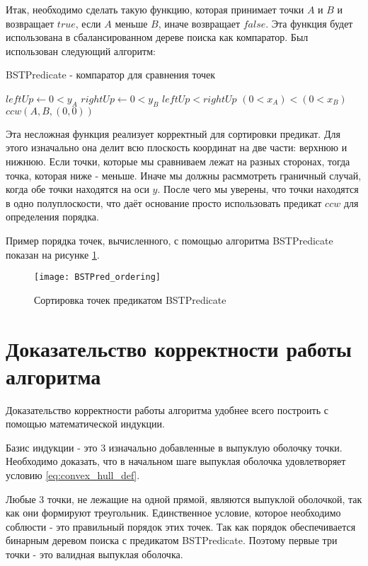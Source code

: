 Итак, необходимо сделать такую функцию, которая принимает точки $A$ и $B$ и возвращает $true$, если $A$ меньше $B$, иначе возвращает $false$. Эта функция будет использована в сбалансированном дереве поиска как компаратор. Был использован следующий алгоритм:

\begin{algorithm}[H]
	\caption{BSTPredicate - компаратор для сравнения точек}
	\label{alg:bst_predicate}
	\begin{algorithmic}[1]
		\State $leftUp \gets 0<y_A$
		\State $rightUp \gets 0<y_B$
			\Return $leftUp < rightUp$
		\EndIf
			\Return $(0<x_A) < (0<x_B)$
		\EndIf
		\Return $ccw(A, B, (0, 0))$
		\EndProcedure
	\end{algorithmic}
\end{algorithm}

Эта несложная функция реализует корректный для сортировки предикат. Для этого изначально она делит всю плоскость координат на две части: верхнюю и нижнюю. Если точки, которые мы сравниваем лежат на разных сторонах, тогда точка, которая ниже - меньше. Иначе мы должны расммотреть граничный случай, когда обе точки находятся на оси $y$. После чего мы уверены, что точки находятся в одно полуплоскости, что даёт основание просто использовать предикат $ccw$ для определения порядка.

Пример порядка точек, вычисленного, с помощью алгоритма BSTPredicate показан на рисунке \ref{img:BSTPred_ordering}.

\begin{figure}[H]
	\centering
	\texttt{[image: BSTPred\_ordering]}
	\caption{Сортировка точек предикатом BSTPredicate}
	\label{img:BSTPred_ordering}
\end{figure}

\section{Доказательство корректности работы алгоритма} \label{subsect2_3}

Доказательство корректности работы алгоритма удобнее всего построить с помощью математической индукции.

Базис индукции - это 3 изначально добавленные в выпуклую оболочку точки. Необходимо доказать, что в начальном шаге выпуклая оболочка удовлетворяет условию \ref{eq:convex_hull_def}.

Любые 3 точки, не лежащие на одной прямой, являются выпуклой оболочкой, так как они формируют треугольник. Единственное условие, которое необходимо соблюсти - это правильный порядок этих точек. Так как порядок обеспечивается бинарным деревом поиска с предикатом BSTPredicate. Поэтому первые три точки - это валидная выпуклая оболочка.

